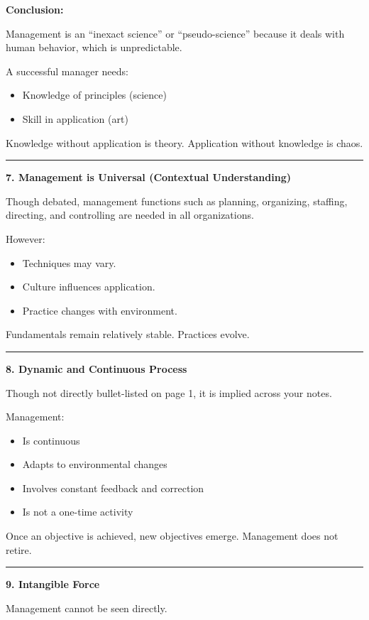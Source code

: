 \documentclass[10pt,a4paper]{article}
\newcommand{\separator}{\vspace{0.4em}\noindent\rule{\linewidth}{0.6pt}\vspace{0.4em}}
\begin{document}
\textbf{Conclusion:}

Management is an ``inexact science'' or ``pseudo-science'' because it deals with human
behavior, which is unpredictable.

A successful manager needs:

\begin{itemize}
  \item Knowledge of principles (science)
  \item Skill in application (art)
\end{itemize}

Knowledge without application is theory.
Application without knowledge is chaos.

\separator

\textbf{7. Management is Universal (Contextual Understanding)}

Though debated, management functions such as planning, organizing, staffing, directing,
and controlling are needed in all organizations.

However:

\begin{itemize}
  \item Techniques may vary.
  \item Culture influences application.
  \item Practice changes with environment.
\end{itemize}

Fundamentals remain relatively stable. Practices evolve.

\separator

\textbf{8. Dynamic and Continuous Process}

Though not directly bullet-listed on page 1, it is implied across your notes.

Management:

\begin{itemize}
  \item Is continuous
  \item Adapts to environmental changes
  \item Involves constant feedback and correction
  \item Is not a one-time activity
\end{itemize}

Once an objective is achieved, new objectives emerge. Management does not retire.

\separator

\textbf{9. Intangible Force}

Management cannot be seen directly.
\end{document}

